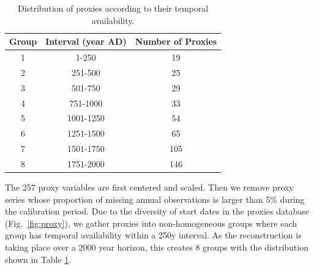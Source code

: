 \documentclass[12pt]{amsart}
\theoremstyle{plain}
\theoremstyle{definition}
\theoremstyle{remark}
\newcommand{\lb}[1]{\color{MidnightBlue}\textbf{[LB: #1]}\normalcolor}
\newcommand{\jeg}[1]{\color{ProcessBlue}\textbf{[JEG: #1]}\normalcolor}
\begin{document}
\begin{table}
  \centering
  \begin{tabular}{c|c|c}
    \toprule
    Group & Interval (year AD) & Number of Proxies\\
    \midrule
    1 & 1-250 & 19 \\
    2 & 251-500 & 25 \\
    3 & 501-750 & 29 \\
    4 & 751-1000 & 33 \\
    5 & 1001-1250 & 54 \\
    6 & 1251-1500 & 65 \\
    7 & 1501-1750 & 105 \\
    8 & 1751-2000 & 146 \\
    \bottomrule
  \end{tabular}
  \caption{Distribution of proxies according to their temporal availability.}
  \label{tab:distdate}
\end{table}

The 257 proxy variables are first centered and scaled. Then we remove
proxy series whose proportion of missing annual observations is larger than 5\%
during the calibration  period.  %
Due to the diversity of start dates in the proxies database (Fig.~\ref{fig:proxy}), we gather proxies into non-homogeneous groups where each group has temporal availability within a 250y interval. As the reconstruction is taking place over a 2000 year
horizon, this creates 8 groups with the distribution shown in Table \ref{tab:distdate}. 
\end{document}
